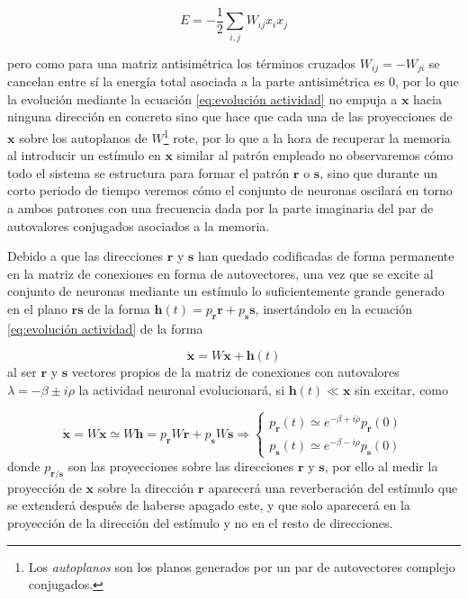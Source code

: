 \documentclass[11pt,a4paper,twoside,pdf]{article}
\numberwithin{equation}{section}
\begin{document}
\begin{equation}
  E = -\frac{1}{2}\sum_{i,j}W_{ij}x_ix_j
\end{equation}

pero como para una matriz antisimétrica los términos cruzados \(W_{ij} = -W_{ji}\) se cancelan entre sí  la energía total asociada a la parte antisimétrica es 0, por lo que la evolución mediante la ecuación \eqref{eq:evolución actividad} no empuja a \(\mathbf{x}\) hacia ninguna dirección en concreto sino que hace que cada una de las proyecciones de \(\mathbf{x}\) sobre los autoplanos de \(W\)\footnote{Los \emph{autoplanos} son los planos generados por un par de autovectores complejo conjugados.} rote, por lo que a la hora de recuperar la memoria al introducir un estímulo en \(\mathbf{x}\) similar al patrón empleado no observaremos cómo todo el sistema se estructura para formar el patrón \(\mathbf{r}\) o \(\mathbf{s}\), sino que durante un corto periodo de tiempo veremos cómo el conjunto de neuronas oscilará en torno a ambos patrones con una frecuencia dada por la parte imaginaria del par de autovalores conjugados asociados a la memoria.

Debido a que las direcciones \(\mathbf{r}\) y \(\mathbf{s}\) han quedado codificadas de forma permanente en la matriz de conexiones en forma de autovectores, una vez que se excite al conjunto de neuronas mediante un estímulo lo suficientemente grande generado en el plano \(\mathbf{rs}\) de la forma \(\mathbf{h}(t) = p_\mathbf{r} \mathbf{r} + p_\mathbf{s} \mathbf{s}\), insertándolo en la ecuación \ref{eq:evolución actividad} de la forma

\begin{equation}
  \dot{\mathbf{x}} = W\mathbf{x} + \mathbf{h}(t)
\end{equation}
al ser \(\mathbf{r}\) y \(\mathbf{s}\) vectores propios de la matriz de conexiones con autovalores \(\lambda = -\beta \pm i \rho\) la actividad neuronal evolucionará, si \(\mathbf{h}(t) \ll \mathbf{x}\) sin excitar, como 

\begin{equation}
  \dot{\mathbf{x}} = W\mathbf{x} \simeq W\mathbf{h} = p_\mathbf{r} W\mathbf{r} + p_\mathbf{s} W\mathbf{s} \Rightarrow
  \begin{cases}
    p_\mathbf{r}(t) \simeq e^{-\beta + i\rho}p_\mathbf{r}(0)\\
    p_\mathbf{s}(t) \simeq e^{-\beta - i\rho}p_\mathbf{s}(0)
  \end{cases}
\end{equation}
donde \(p_{\mathbf{r/s}}\) son las proyecciones sobre las direcciones \(\mathbf{r}\) y \(\mathbf{s}\), por ello al medir la proyección de \(\mathbf{x}\) sobre la dirección \(\mathbf{r}\) aparecerá una reverberación del estímulo que se extenderá después de haberse apagado este, y que solo aparecerá en la proyección de la dirección del estímulo y no en el resto de direcciones. 
\end{document}
